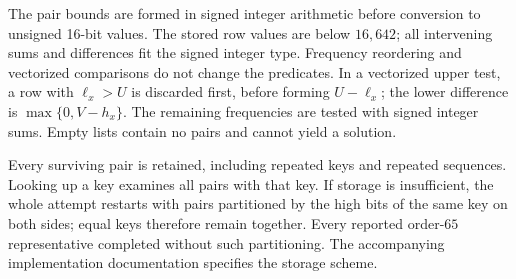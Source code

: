 \documentclass[11pt]{article}
\begin{document}
\begin{appendices}
The pair bounds are formed in signed integer arithmetic before conversion
to unsigned 16-bit values. The stored row values are below $16{,}642$;
all intervening sums and differences fit the signed integer type.
Frequency reordering and vectorized comparisons do not change the
predicates. In a vectorized upper test, a row with $\ell_x>U$ is discarded
first, before forming $U-\ell_x$; the lower difference is
$\max\{0,V-h_x\}$. The remaining frequencies are tested with signed
integer sums. Empty lists contain no pairs and cannot yield a solution.

Every surviving pair is retained, including repeated keys and repeated
sequences. Looking up a key examines all pairs with that key. If storage
is insufficient, the whole attempt restarts with pairs partitioned by
the high bits of the same key on both sides; equal keys therefore remain
together. Every reported order-$65$ representative completed without such
partitioning. The accompanying implementation documentation specifies the
storage scheme.



\end{appendices}
\end{document}
